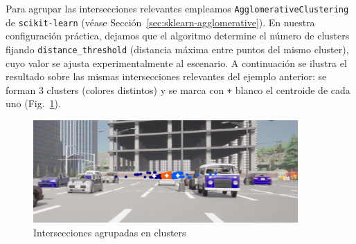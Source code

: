 \noindent
Para agrupar las intersecciones relevantes empleamos \texttt{AgglomerativeClustering} de \texttt{scikit-learn}
(véase Sección~\ref{sec:sklearn-agglomerative}). En nuestra configuración práctica,
dejamos que el algoritmo determine el número de clusters fijando \texttt{distance\_threshold} (distancia máxima entre puntos del mismo
cluster), cuyo valor se ajusta experimentalmente al escenario. A continuación se ilustra el resultado sobre las mismas
intersecciones relevantes del ejemplo anterior: se forman 3 clusters (colores distintos) y se marca con \texttt{+} blanco el centroide de cada uno
(Fig.~\ref{fig:clusters}).
\begin{figure}[!ht]
    \centering
    \includegraphics[width=0.9\textwidth]{img/reticule/AgglomerativeClustering}
    \caption{Intersecciones agrupadas en clusters}
    \label{fig:clusters}
\end{figure}



